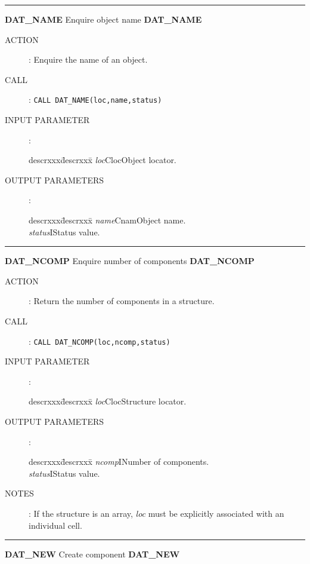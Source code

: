 \rule{\textwidth}{0.3mm}
{\Large {\bf DAT\_NAME} \hfill Enquire object name \hfill {\bf DAT\_NAME}}
\begin{description}
\item [ACTION]:
Enquire the name of an object.
\item [CALL]:
{\tt CALL DAT\_NAME(loc,name,status)}
\item [INPUT PARAMETER]:
\begin{tabbing}
descrxxx\=descrxxx\=\kill
{\em loc}\>Cloc\>Object locator.
\end{tabbing}
\item [OUTPUT PARAMETERS]:
\begin{tabbing}
descrxxx\=descrxxx\=\kill
{\em name}\>Cnam\>Object name.\\
{\em status}\>I\>Status value.
\end{tabbing}
\end{description}
\goodbreak
\rule{\textwidth}{0.3mm}
{\Large {\bf DAT\_NCOMP} \hfill Enquire number of components \hfill {\bf DAT\_NCOMP}}
\begin{description}
\item [ACTION]:
Return the number of components in a structure.
\item [CALL]:
{\tt CALL DAT\_NCOMP(loc,ncomp,status)}
\item [INPUT PARAMETER]:
\begin{tabbing}
descrxxx\=descrxxx\=\kill
{\em loc}\>Cloc\>Structure locator.
\end{tabbing}
\item [OUTPUT PARAMETERS]:
\begin{tabbing}
descrxxx\=descrxxx\=\kill
{\em ncomp}\>I\>Number of components.\\
{\em status}\>I\>Status value.
\end{tabbing}
\item [NOTES]:
If the structure is an array, {\em loc} must be explicitly associated with an
individual cell.
\end{description}
\goodbreak
\rule{\textwidth}{0.3mm}
{\Large {\bf DAT\_NEW} \hfill Create component \hfill {\bf DAT\_NEW}}
